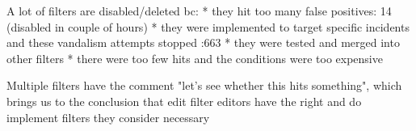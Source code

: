 \begin{comment}
\textbf{Questions on abuse\_filter\_log table}
\begin{itemize}
    \item how often were filters with different actions triggered? (afl\_actions)
    \item what types of users trigger the filters (IPs? registered?) : IPs: 16,489,266, logged in users: 6,984,897 (Stand 15.03.2019);
    \item on what articles filters get triggered most frequently (afl\_title)
    \item what types of user actions trigger filters most frequently? (afl\_action) (edit, delete, createaccount, move, upload, autocreateaccount, stashupload)
    \item in which namespaces get filters triggered most frequently?
\end{itemize}

\textbf{Questions on abuse\_filter\_action table}
\begin{itemize}
    \item how many filters trigger any particular action (at the moment)?
    \item how many different parameters are there (i.e. tags when tagging, or templates to show upon a warning)?
\end{itemize}
\end{comment}


A lot of filters are disabled/deleted bc:
* they hit too many false positives: 14 (disabled in couple of hours)
* they were implemented to target specific incidents and these vandalism attempts stopped :663
* they were tested and merged into other filters
* there were too few hits and the conditions were too expensive

Multiple filters have the comment "let's see whether this hits something", which brings us to the conclusion that edit filter editors have the right and do implement filters they consider necessary


